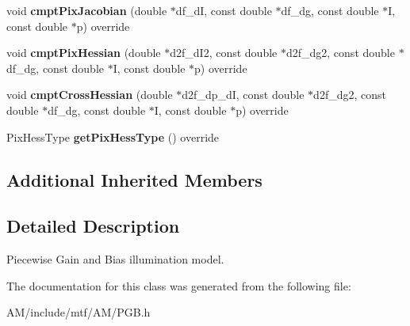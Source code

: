\begin{DoxyCompactItemize}
\item 
\hypertarget{classPGB_a91cf0278a6f8cc07097c8fbd32524e66}{void {\bfseries cmpt\-Pix\-Jacobian} (double $\ast$df\-\_\-d\-I, const double $\ast$df\-\_\-dg, const double $\ast$I, const double $\ast$p) override}\label{classPGB_a91cf0278a6f8cc07097c8fbd32524e66}

\item 
\hypertarget{classPGB_a0ecdb9ad6c6e85a76e54874f93469b66}{void {\bfseries cmpt\-Pix\-Hessian} (double $\ast$d2f\-\_\-d\-I2, const double $\ast$d2f\-\_\-dg2, const double $\ast$df\-\_\-dg, const double $\ast$I, const double $\ast$p) override}\label{classPGB_a0ecdb9ad6c6e85a76e54874f93469b66}

\item 
\hypertarget{classPGB_a643c38f6f8b4b35a2a2cb146fd09f883}{void {\bfseries cmpt\-Cross\-Hessian} (double $\ast$d2f\-\_\-dp\-\_\-d\-I, const double $\ast$d2f\-\_\-dg2, const double $\ast$df\-\_\-dg, const double $\ast$I, const double $\ast$p) override}\label{classPGB_a643c38f6f8b4b35a2a2cb146fd09f883}

\item 
\hypertarget{classPGB_a16a5cbdc881bb48177db00ff281aa9fb}{Pix\-Hess\-Type {\bfseries get\-Pix\-Hess\-Type} () override}\label{classPGB_a16a5cbdc881bb48177db00ff281aa9fb}

\end{DoxyCompactItemize}
\subsection*{Additional Inherited Members}


\subsection{Detailed Description}
Piecewise Gain and Bias illumination model. 

The documentation for this class was generated from the following file\-:\begin{DoxyCompactItemize}
\item 
A\-M/include/mtf/\-A\-M/P\-G\-B.\-h\end{DoxyCompactItemize}
